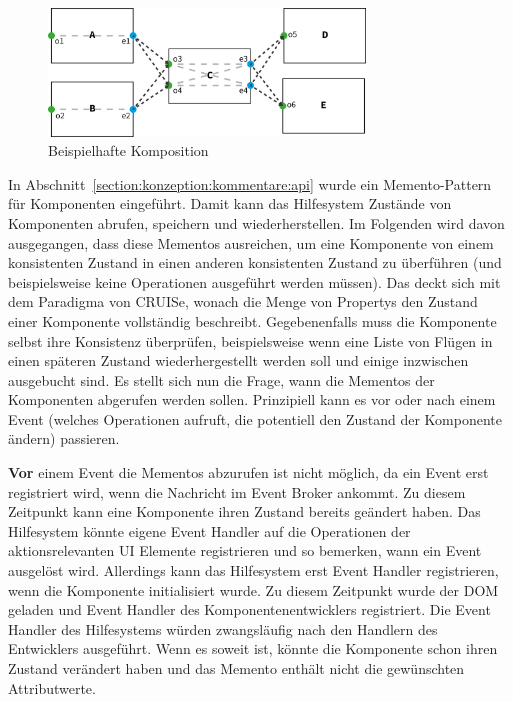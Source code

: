 \documentclass[
	headsepline,
	footsepline,
	fontsize=12pt,
	bibliography=totoc
]{scrbook}
\begin{document}
\begin{figure}[htbp]
   \centering
   \includegraphics[width=0.75\textwidth]{images/konzeption-dependency-graph-example.png}
   \caption{Beispielhafte Komposition}
   \label{figure:dependency-graph-example}
\end{figure}

In Abschnitt~\ref{section:konzeption:kommentare:api} wurde ein Memento-Pattern für Komponenten eingeführt. Damit kann das Hilfesystem Zustände von Komponenten abrufen, speichern und wiederherstellen. Im Folgenden wird davon ausgegangen, dass diese Mementos ausreichen, um eine Komponente von einem konsistenten Zustand in einen anderen konsistenten Zustand zu überführen (und beispielsweise keine Operationen ausgeführt werden müssen). Das deckt sich mit dem Paradigma von CRUISe, wonach die Menge von Propertys den Zustand einer Komponente vollständig beschreibt. Gegebenenfalls muss die Komponente selbst ihre Konsistenz überprüfen, beispielsweise wenn eine Liste von Flügen in einen späteren Zustand wiederhergestellt werden soll und einige inzwischen ausgebucht sind. Es stellt sich nun die Frage, wann die Mementos der Komponenten abgerufen werden sollen. Prinzipiell kann es vor oder nach einem Event (welches Operationen aufruft, die potentiell den Zustand der Komponente ändern) passieren.


\textbf{Vor} einem Event die Mementos abzurufen ist nicht möglich, da ein Event erst registriert wird, wenn die Nachricht im Event Broker ankommt. Zu diesem Zeitpunkt kann eine Komponente ihren Zustand bereits geändert haben. Das Hilfesystem könnte eigene Event Handler auf die Operationen der aktionsrelevanten UI Elemente registrieren und so bemerken, wann ein Event ausgelöst wird. Allerdings kann das Hilfesystem erst Event Handler registrieren, wenn die Komponente initialisiert wurde. Zu diesem Zeitpunkt wurde der DOM geladen und Event Handler des Komponentenentwicklers registriert. Die Event Handler des Hilfesystems würden zwangsläufig nach den Handlern des Entwicklers ausgeführt. Wenn es soweit ist, könnte die Komponente schon ihren Zustand verändert haben und das Memento enthält nicht die gewünschten Attributwerte.
\end{document}

